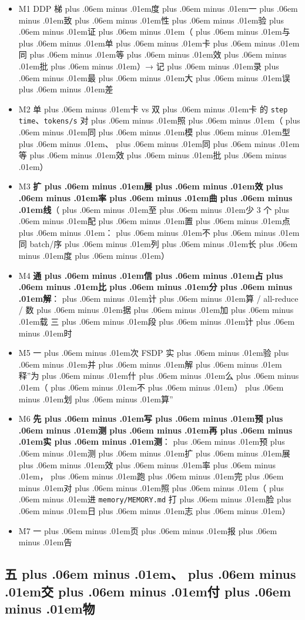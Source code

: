 \documentclass[
]{article}
\newcommand{\passthrough}[1]{#1}
\providecommand{\tightlist}{%
  \setlength{\itemsep}{0pt}\setlength{\parskip}{0pt}}
\def\zh#1{{\zhfont #1}}
\def\sym#1{{\symfont #1}}
\def\zhglue{\hskip0pt plus .06em minus .01em}
\begin{document}
\begin{itemize}
\tightlist
\item[$\square$]
  M1 DDP \zh{梯\zhglue 度\zhglue 一\zhglue 致\zhglue 性\zhglue 验\zhglue 证\zhglue （\zhglue 与\zhglue 单\zhglue 卡\zhglue 同\zhglue 等\zhglue 效\zhglue 批\zhglue ）}\sym{→} \zh{记\zhglue 录\zhglue 最\zhglue 大\zhglue 误\zhglue 差}
\item[$\square$]
  M2 \zh{单\zhglue 卡} vs \zh{双\zhglue 卡} \zh{的} \passthrough{\lstinline!step time!}\zh{、}\passthrough{\lstinline!tokens/s!} \zh{对\zhglue 照\zhglue （\zhglue 同\zhglue 模\zhglue 型\zhglue 、\zhglue 同\zhglue 等\zhglue 效\zhglue 批\zhglue ）}
\item[$\square$]
  M3 \textbf{\zh{扩\zhglue 展\zhglue 效\zhglue 率\zhglue 曲\zhglue 线}}\zh{（\zhglue 至\zhglue 少} 3 \zh{个\zhglue 配\zhglue 置\zhglue 点\zhglue ：\zhglue 不\zhglue 同} batch/\zh{序\zhglue 列\zhglue 长\zhglue 度\zhglue ）}
\item[$\square$]
  M4 \textbf{\zh{通\zhglue 信\zhglue 占\zhglue 比\zhglue 分\zhglue 解}}\zh{：\zhglue 计\zhglue 算} / all-reduce / \zh{数\zhglue 据\zhglue 加\zhglue 载} \zh{三\zhglue 段\zhglue 计\zhglue 时}
\item[$\square$]
  M5 \zh{一\zhglue 次} FSDP \zh{实\zhglue 验\zhglue 并\zhglue 解\zhglue 释}''\zh{为\zhglue 什\zhglue 么\zhglue （\zhglue 不\zhglue ）\zhglue 划\zhglue 算}''
\item[$\square$]
  M6 \textbf{\zh{先\zhglue 写\zhglue 预\zhglue 测\zhglue 再\zhglue 实\zhglue 测}}\zh{：\zhglue 预\zhglue 测\zhglue 扩\zhglue 展\zhglue 效\zhglue 率\zhglue ，\zhglue 跑\zhglue 完\zhglue 对\zhglue 照\zhglue （\zhglue 进} \passthrough{\lstinline!memory/MEMORY.md!} \zh{打\zhglue 脸\zhglue 日\zhglue 志\zhglue ）}
\item[$\square$]
  M7 \zh{一\zhglue 页\zhglue 报\zhglue 告}
\end{itemize}

\subsection{\zh{五\zhglue 、\zhglue 交\zhglue 付\zhglue 物}}\label{ux4e94ux4ea4ux4ed8ux7269}
\end{document}

